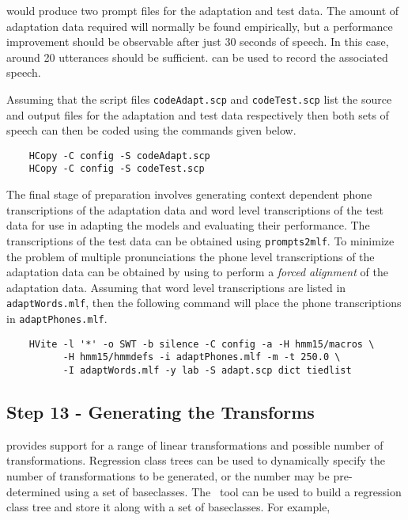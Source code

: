 \noindent
would produce two prompt files for the adaptation and test data. The amount of 
adaptation data required will normally be found empirically, but a performance 
improvement should be observable after just 30 seconds of speech.
In this case, around 20 utterances should be sufficient.
 can be used to record the associated speech.

Assuming that the script files \texttt{codeAdapt.scp} and \texttt{codeTest.scp} 
list the source and output files for the adaptation and test data respectively 
then both sets of speech can then be coded using the  commands given 
below.

\begin{verbatim}
    HCopy -C config -S codeAdapt.scp
    HCopy -C config -S codeTest.scp
\end{verbatim}

\noindent
The final stage of preparation involves generating context dependent phone 
transcriptions of the adaptation data and word level transcriptions of the test 
data for use in adapting the models and evaluating their performance.
The transcriptions of the test data can be obtained using \texttt{prompts2mlf}.
To minimize the problem of multiple pronunciations the phone level 
transcriptions of the adaptation data can be obtained by using 
to perform a \textit{forced alignment} of the adaptation data. Assuming 
that word level transcriptions are listed in \texttt{adaptWords.mlf}, then the
following command will place the phone transcriptions in 
\texttt{adaptPhones.mlf}.

\begin{verbatim}
    HVite -l '*' -o SWT -b silence -C config -a -H hmm15/macros \ 
          -H hmm15/hmmdefs -i adaptPhones.mlf -m -t 250.0 \ 
          -I adaptWords.mlf -y lab -S adapt.scp dict tiedlist
\end{verbatim}

\subsection{Step 13 - Generating the Transforms}
  provides
support for a range of linear transformations and possible number of
transformations. Regression class trees\index{adaptation!regression
tree} can be used to dynamically specify the number of transformations
to be generated, or the number may be pre-determined using a set of
baseclasses. The \HTK\ tool \htool{HHEd} can be used to build a
regression class tree and store it along with a set of baseclasses. For
example,

